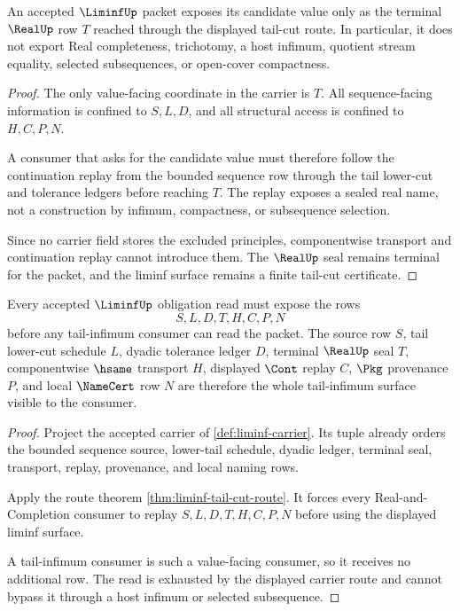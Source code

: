 \begin{theorem}
\label{thm:liminf-real-seal-nonescape}
An accepted $\LiminfUp$ packet exposes its candidate value only as the terminal $\RealUp$ row $T$ reached through the displayed tail-cut route. In particular, it does not export Real completeness, trichotomy, a host infimum, quotient stream equality, selected subsequences, or open-cover compactness.
\end{theorem}
\begin{proof}
The only value-facing coordinate in the carrier is $T$. All sequence-facing information is confined to $S,L,D$, and all structural access is confined to $H,C,P,N$.

A consumer that asks for the candidate value must therefore follow the continuation replay from the bounded sequence row through the tail lower-cut and tolerance ledgers before reaching $T$. The replay exposes a sealed real name, not a construction by infimum, compactness, or subsequence selection.

Since no carrier field stores the excluded principles, componentwise transport and continuation replay cannot introduce them. The $\RealUp$ seal remains terminal for the packet, and the liminf surface remains a finite tail-cut certificate.
\end{proof}

\begin{theorem}
\label{thm:liminf-obligation-tail-infimum-route}
Every accepted $\LiminfUp$ obligation read must expose the rows
$$
S,L,D,T,H,C,P,N
$$
before any tail-infimum consumer can read the packet. The source row $S$, tail lower-cut schedule $L$, dyadic tolerance ledger $D$, terminal $\RealUp$ seal $T$, componentwise $\hsame$ transport $H$, displayed $\Cont$ replay $C$, $\Pkg$ provenance $P$, and local $\NameCert$ row $N$ are therefore the whole tail-infimum surface visible to the consumer.
\end{theorem}
\begin{proof}
Project the accepted carrier of \autoref{def:liminf-carrier}. Its tuple already orders the bounded sequence source, lower-tail schedule, dyadic ledger, terminal seal, transport, replay, provenance, and local naming rows.

Apply the route theorem \autoref{thm:liminf-tail-cut-route}. It forces every Real-and-Completion consumer to replay $S,L,D,T,H,C,P,N$ before using the displayed liminf surface.

A tail-infimum consumer is such a value-facing consumer, so it receives no additional row. The read is exhausted by the displayed carrier route and cannot bypass it through a host infimum or selected subsequence.
\end{proof}


